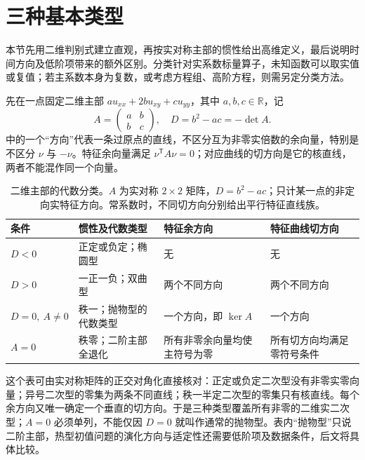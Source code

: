 \section{三种基本类型}
\label{b2:sec:0802}

本节先用二维判别式建立直观，再按实对称主部的惯性给出高维定义，最后说明时间方向及低阶项带来的额外区别。分类针对实系数标量算子，未知函数可以取实值或复值；若主系数本身为复数，或考虑方程组、高阶方程，则需另定分类方法。

\ProseParagraphBreak

先在一点固定二维主部 \(a u_{xx}+2b u_{xy}+c u_{yy}\)，其中 \(a,b,c\in\mathbb R\)，记
\[
 A=\begin{pmatrix}a&b\\b&c\end{pmatrix},\quad D=b^2-ac=-\det A.
\]
中的一个“方向”代表一条过原点的直线，不区分互为非零实倍数的余向量，特别是不区分 \(\nu\) 与 \(-\nu\)。特征余向量满足 \(\nu^{\mathsf T}A\nu=0\)；对应曲线的切方向是它的核直线，两者不能混作同一个向量。

\begin{table}[htbp]
\centering
\small
\setlength{\tabcolsep}{4pt}
\caption[二维主部的代数分类]{二维主部的代数分类。\(A\) 为实对称 \(2\times2\) 矩阵，\(D=b^2-ac\)；只计某一点的非定向实特征方向。常系数时，不同切方向分别给出平行特征直线族。}
\label{b2:tab:08-planar-classification}
\begin{tabularx}{\linewidth}{@{}>{\raggedright\arraybackslash}p{2.3cm}>{\raggedright\arraybackslash}p{3.8cm}>{\raggedright\arraybackslash}p{3.2cm}>{\raggedright\arraybackslash}X@{}}
\toprule
条件 & 惯性及代数类型 & 特征余方向 & 特征曲线切方向 \\
\midrule
\(D<0\) & 正定或负定；椭圆型 & 无 & 无 \\
\(D>0\) & 一正一负；双曲型 & 两个不同方向 & 两个不同方向 \\
\(D=0,\ A\ne0\) & 秩一；抛物型的代数类型 & 一个方向，即 \(\ker A\) & 一个方向 \\
\(A=0\) & 秩零；二阶主部全退化 & 所有非零余向量均使主符号为零 & 所有切方向均满足零符号条件 \\
\bottomrule
\end{tabularx}
\end{table}

这个表可由实对称矩阵的正交对角化直接核对：正定或负定二次型没有非零实零向量；异号二次型的零集为两条不同直线；秩一半定二次型的零集只有核直线。每个余方向又唯一确定一个垂直的切方向。于是三种类型覆盖所有非零的二维实二次型；\(A=0\) 必须单列，不能仅因 \(D=0\) 就叫作通常的抛物型。表内“抛物型”只说二阶主部，热型初值问题的演化方向与适定性还需要低阶项及数据条件，后文将具体比较。

